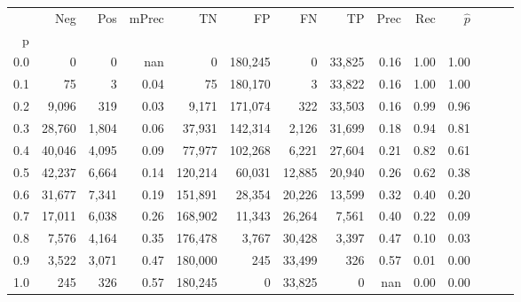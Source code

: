 \begin{tabular}{rrrrrrrrrrrrrr}
\toprule
{} &     Neg &    Pos & mPrec &       TN &       FP &      FN &      TP &  Prec &   Rec & $\hat{p}$ \\
p   &         &        &       &          &          &         &         &       &       &           \\
\midrule
0.0 &       0 &      0 &   nan &        0 &  180,245 &       0 &  33,825 &  0.16 &  1.00 &      1.00 \\
0.1 &      75 &      3 &  0.04 &       75 &  180,170 &       3 &  33,822 &  0.16 &  1.00 &      1.00 \\
0.2 &   9,096 &    319 &  0.03 &    9,171 &  171,074 &     322 &  33,503 &  0.16 &  0.99 &      0.96 \\
0.3 &  28,760 &  1,804 &  0.06 &   37,931 &  142,314 &   2,126 &  31,699 &  0.18 &  0.94 &      0.81 \\
0.4 &  40,046 &  4,095 &  0.09 &   77,977 &  102,268 &   6,221 &  27,604 &  0.21 &  0.82 &      0.61 \\
0.5 &  42,237 &  6,664 &  0.14 &  120,214 &   60,031 &  12,885 &  20,940 &  0.26 &  0.62 &      0.38 \\
0.6 &  31,677 &  7,341 &  0.19 &  151,891 &   28,354 &  20,226 &  13,599 &  0.32 &  0.40 &      0.20 \\
0.7 &  17,011 &  6,038 &  0.26 &  168,902 &   11,343 &  26,264 &   7,561 &  0.40 &  0.22 &      0.09 \\
0.8 &   7,576 &  4,164 &  0.35 &  176,478 &    3,767 &  30,428 &   3,397 &  0.47 &  0.10 &      0.03 \\
0.9 &   3,522 &  3,071 &  0.47 &  180,000 &      245 &  33,499 &     326 &  0.57 &  0.01 &      0.00 \\
1.0 &     245 &    326 &  0.57 &  180,245 &        0 &  33,825 &       0 &   nan &  0.00 &      0.00 \\
\bottomrule
\end{tabular}
